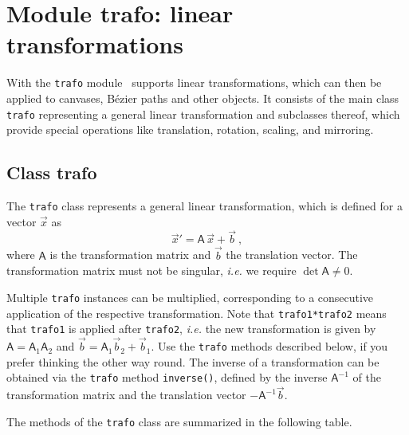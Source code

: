 \chapter{Module trafo: linear transformations}

\label{trafo}

With the  \verb|trafo| module \PyX\ supports linear transformations, which can 
then be applied to canvases,  B\'ezier paths and other objects. It consists
of the main class \verb|trafo| representing a general linear
transformation and subclasses thereof, which provide special operations
like translation, rotation, scaling, and mirroring.

\section{Class trafo}

The \verb|trafo| class represents a general linear
transformation, which is defined for a vector $\vec{x}$ as
\[
  \vec{x}' = \mathsf{A}\, \vec{x} + \vec{b}\ ,
\]
where $\mathsf{A}$ is the transformation matrix and $\vec{b}$ the
translation vector. The transformation matrix must not be singular,
\textit{i.e.} we require $\det \mathsf{A} \ne 0$.



Multiple \verb|trafo| instances can be multiplied, corresponding to a
consecutive application of the respective transformation. Note that
\verb|trafo1*trafo2| means that \verb|trafo1| is applied after
\verb|trafo2|, \textit{i.e.} the new transformation is given 
by $\mathsf{A} = \mathsf{A}_1 \mathsf{A}_2$ and
$\vec{b} = \mathsf{A}_1 \vec{b}_2 + \vec{b}_1$.  Use the \verb|trafo|
methods described below, if you prefer thinking the other way round.
The inverse of a transformation can be obtained via the \verb|trafo|
method \verb|inverse()|, defined by the inverse $\mathsf{A}^{-1}$ of
the transformation matrix and the translation vector
$-\mathsf{A}^{-1}\vec{b}$.

The methods of the \verb|trafo| class are summarized in the following
table.

